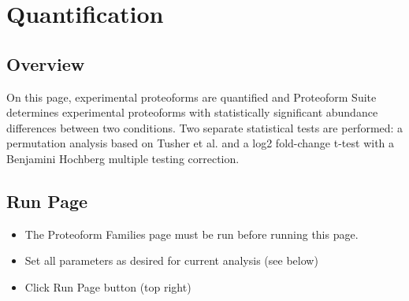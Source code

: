 
\section{Quantification}

\subsection{Overview}
On this page, experimental proteoforms are quantified and Proteoform Suite determines experimental proteoforms with statistically significant abundance differences between two conditions. Two separate statistical tests are performed: a permutation analysis based on Tusher et al.\supercite{Tusher2001} and a log2 fold-change t-test with a Benjamini Hochberg multiple testing correction. 

\subsection{Run Page}
\begin{itemize}
\item The Proteoform Families page must be run before running this page.
\item Set all parameters as desired for current analysis (see below)
\item Click Run Page button (top right)
\end{itemize}

